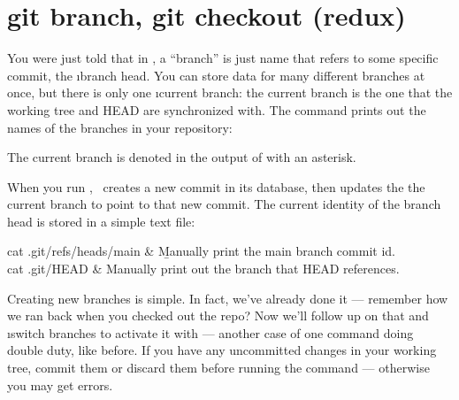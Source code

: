 \documentclass[letterpaper, 12pt, titlepage, twoside]{article}
\begin{document}
\section{git branch, git checkout (redux)}


You \x were just told that in \git, a ``branch'' is just name that refers to
some specific commit, the \i{branch head}. You can store data for many
different branches at once, but there is only one \i{current branch}: the
current branch is the one that the working tree and HEAD are synchronized
with. The  command prints out the names of the branches in your
repository:


The current branch is denoted in the output of  with an asterisk.



When \x you run , \git\ creates a new commit in its database, then
updates the the current branch to point to that new commit. The current
identity of the branch head is stored in a simple text file:

\begin{typeme}
cat .git/refs/heads/main & \b{Manually print the main branch commit id.} \\
cat .git/HEAD & Manually print out the branch that HEAD references.
\end{typeme}

Creating new branches is simple. In fact, we've already done it --- remember how
we ran  back when you checked out the repo? Now we'll
follow up on that and \i{switch branches} to activate it with  ---
another case of one command doing double duty, like  before. If you
have any uncommitted changes in your working tree, commit them or discard them
before running the  command --- otherwise you may get errors.
\end{document}
